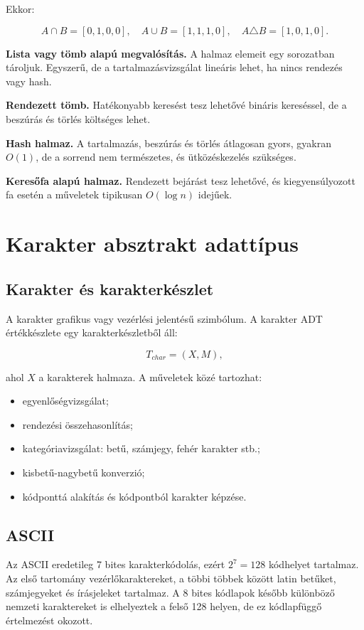 Ekkor:

\[
A\cap B=[0,1,0,0],\quad A\cup B=[1,1,1,0],\quad A\triangle B=[1,0,1,0].
\]

\textbf{Lista vagy tömb alapú megvalósítás.} A halmaz elemeit egy sorozatban tároljuk. Egyszerű, de a tartalmazásvizsgálat lineáris lehet, ha nincs rendezés vagy hash.

\textbf{Rendezett tömb.} Hatékonyabb keresést tesz lehetővé bináris kereséssel, de a beszúrás és törlés költséges lehet.

\textbf{Hash halmaz.} A tartalmazás, beszúrás és törlés átlagosan gyors, gyakran $O(1)$, de a sorrend nem természetes, és ütközéskezelés szükséges.

\textbf{Keresőfa alapú halmaz.} Rendezett bejárást tesz lehetővé, és kiegyensúlyozott fa esetén a műveletek tipikusan $O(\log n)$ idejűek.

\section{Karakter absztrakt adattípus}

\subsection{Karakter és karakterkészlet}

A karakter grafikus vagy vezérlési jelentésű szimbólum. A karakter ADT értékkészlete egy karakterkészletből áll:

\[
T_{char}=(X,M),
\]

ahol $X$ a karakterek halmaza. A műveletek közé tartozhat:

\begin{itemize}
  \item egyenlőségvizsgálat;
  \item rendezési összehasonlítás;
  \item kategóriavizsgálat: betű, számjegy, fehér karakter stb.;
  \item kisbetű-nagybetű konverzió;
  \item kódponttá alakítás és kódpontból karakter képzése.
\end{itemize}

\subsection{ASCII}

Az ASCII eredetileg 7 bites karakterkódolás, ezért $2^7=128$ kódhelyet tartalmaz. Az első tartomány vezérlőkaraktereket, a többi többek között latin betűket, számjegyeket és írásjeleket tartalmaz. A 8 bites kódlapok később különböző nemzeti karaktereket is elhelyeztek a felső 128 helyen, de ez kódlapfüggő értelmezést okozott.

